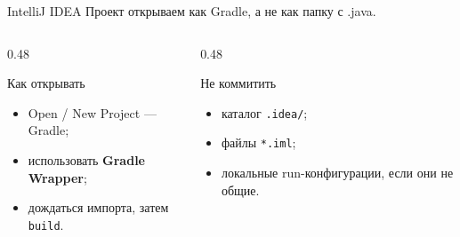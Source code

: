 \begin{frame}{IntelliJ IDEA}
   Проект открываем как Gradle, а не как \flqq папку с .java\frqq.

  \medskip
  \begin{columns}[T]
    \begin{column}{0.48\textwidth}
      \begin{block}{Как открывать}
        \begin{itemize}
          \item Open / New Project --- Gradle;
          \item использовать \textbf{Gradle Wrapper};
          \item дождаться импорта, затем \texttt{build}.
        \end{itemize}
      \end{block}
    \end{column}
    \begin{column}{0.48\textwidth}
      \begin{block}{Не коммитить}
        \begin{itemize}
          \item каталог \texttt{.idea/};
          \item файлы \texttt{*.iml};
          \item локальные run-конфигурации, если они не общие.
        \end{itemize}
      \end{block}
    \end{column}
  \end{columns}
\end{frame}

